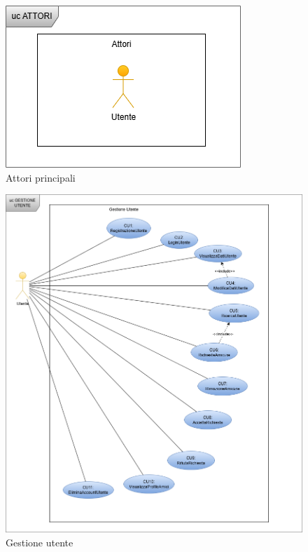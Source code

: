 \documentclass{article}
\begin{document}
\begin{figure}[H]
  \centering
  \includegraphics[width=.6\linewidth]{cu_attori.png}
  \caption{Attori principali}
  \label{fig:sitemap}
\end{figure}

\begin{figure}[H]
  \centering
  \includegraphics[width=.8\linewidth]{cu_utente.png}
  \caption{Gestione utente}
  \label{fig:sitemap}
\end{figure}
\end{document}
